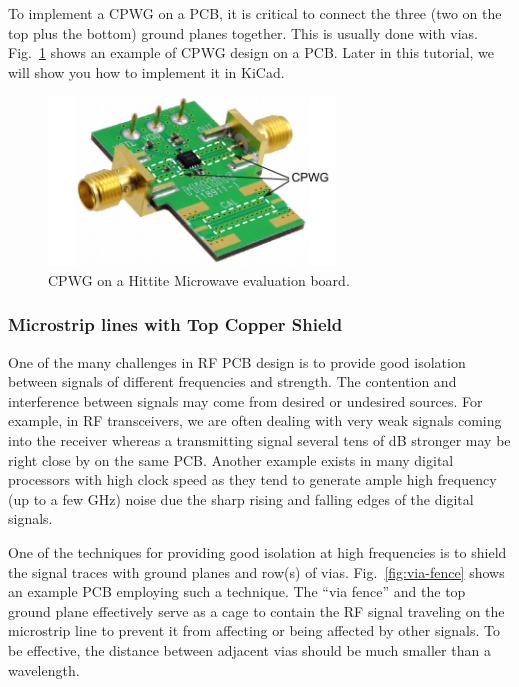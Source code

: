 \documentclass[12pt,letterpaper]{scrartcl}
\begin{document}
To implement a CPWG on a PCB, it is critical to connect the three (two on the top plus the bottom) ground planes together. This is usually done with vias. Fig.~\ref{fig:cpwg-example} shows an example of CPWG design on a PCB. Later in this tutorial, we will show you how to implement it in KiCad. 

	\begin{figure}[hp]
		\centering
		\includegraphics[width=3in]{cpwg-example}
		\caption{CPWG on a Hittite Microwave evaluation board.}
		\label{fig:cpwg-example}
	\end{figure}

\newpage
\subsubsection{Microstrip lines with Top Copper Shield}

One of the many challenges in RF PCB design is to provide good isolation between signals of different frequencies and strength. The contention and interference between signals may come from desired or undesired sources. For example, in RF transceivers, we are often dealing with very weak signals coming into the receiver whereas a transmitting signal several tens of dB stronger may be right close by on the same PCB. Another example exists in many digital processors with high clock speed as they tend to generate ample high frequency (up to a few GHz) noise due the sharp rising and falling edges of the digital signals. 

One of the techniques for providing good isolation at high frequencies is to shield the signal traces with ground planes and row(s) of vias.  Fig.~\ref{fig:via-fence} shows an example PCB employing such a technique. The ``via fence'' and the top ground plane effectively serve as a cage to contain the RF signal traveling on the microstrip line to prevent it from affecting or being affected by other signals. To be effective, the distance between adjacent vias should be much smaller than a wavelength. 
\end{document}
